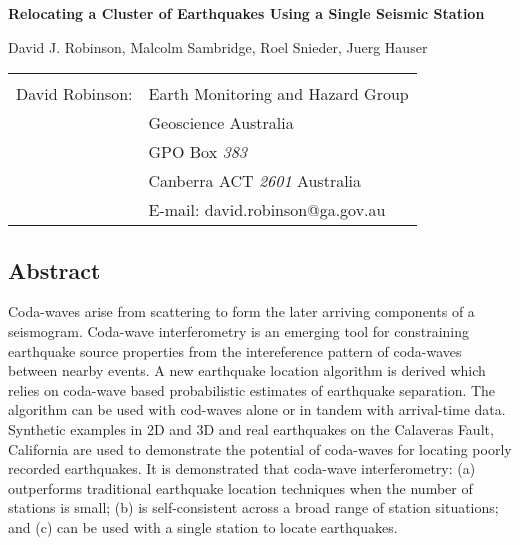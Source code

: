\documentclass[12pt,double]{article}
\begin{document}
\begin{centering}
\LARGE{\textbf{Relocating a Cluster of Earthquakes Using a Single Seismic Station}} \\  
\end{centering}
\vspace{3em}
\begin{centering}
David J. Robinson, Malcolm Sambridge, Roel Snieder, Juerg Hauser \\
\end{centering}

\vspace{7em}
\begin{tabular}{lp{}}
 & \\
David Robinson: & Earth Monitoring and Hazard Group \\
 &  Geoscience Australia \\
 & GPO Box \emph{383} \\
 & Canberra ACT \emph{2601} Australia \\
 & E-mail: david.robinson@ga.gov.au\\
\end{tabular}

\clearpage
\label{firstpage}


\vspace{2em}
\begin{centering}
\section*{Abstract}
\end{centering}
Coda-waves arise from scattering to form the later arriving
components of a seismogram. Coda-wave interferometry is an emerging
tool for constraining earthquake source properties from the
intereference pattern of coda-waves between nearby events. A new
earthquake location algorithm is derived which relies on coda-wave
based probabilistic estimates of earthquake separation. The
algorithm can be used with cod-waves alone or in tandem with arrival-time 
data. Synthetic examples in 2D and 3D and real earthquakes on
the Calaveras Fault, California are used to demonstrate the
potential of coda-waves for locating poorly recorded earthquakes. It
is demonstrated that coda-wave interferometry: (a) outperforms
traditional earthquake location techniques when the number of
stations is small; (b) is self-consistent across a broad range of
station situations; and (c) can be used with a single station to
locate earthquakes.
\end{document}
